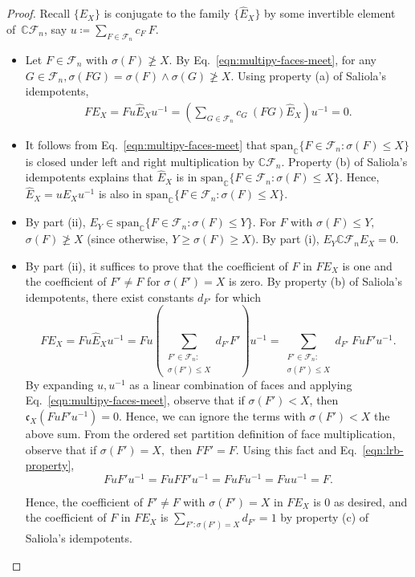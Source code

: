 \documentclass[ALCO, Unicode]{cedram}
\def\C{{\mathbb{C}}}
\begin{document}
\begin{proof}
 Recall $\{E_X\}$ is conjugate to the family $\{\widehat{E}_X\}$ by some invertible element of~$\C\mathcal{F}_n$, say $u \coloneqq  \sum_{F \in \mathcal{F}_n}c_{F} \ F.$

\begin{itemize}
    \item[(i)] Let $F \in \mathcal{F}_n$ with $\sigma(F) \ngeq X.$ By Eq.~\eqref{eqn:multipy-faces-meet}, for any $G \in \mathcal{F}_n,  \sigma(FG) = \sigma(F) \wedge \sigma(G) \ngeq X.$ Using property (a) of Saliola's idempotents,
    \begin{align*}
        FE_X = Fu\widehat{E}_Xu^{-1} = \left(\sum_{G \in \mathcal{F}_n}c_G \ (FG)\widehat{E}_X\right)u^{-1} = 0.
    \end{align*}
\item[(ii)] It follows from Eq.~\eqref{eqn:multipy-faces-meet} that $\mathrm{span}_\C \{F \in \mathcal{F}_n: \sigma(F) \leq X\}$ is closed under left and right multiplication by $\C \mathcal{F}_n.$ Property (b) of Saliola's idempotents explains that $\widehat{E}_X$ is in $\mathrm{span}_\C \{F \in \mathcal{F}_n: \sigma(F) \leq X\}.$ Hence, $\widehat{E}_X = uE_Xu^{-1}$ is also in $\mathrm{span}_\C \{F \in \mathcal{F}_n: \sigma(F) \leq X\}.$
\item[(iii)]  By part (ii), $E_Y \in \mathrm{span}_\C \{F\in \mathcal{F}_n: \sigma(F) \leq Y\}.$ For $F$ with $\sigma(F) \leq Y,$ $\sigma(F) \ngeq X$ (since otherwise, $Y \geq \sigma(F) \geq X).$ By part (i), $E_Y \C \mathcal{F}_n E_{X} = 0.$
\item[(iv)] By part (ii), it suffices to prove that the coefficient of $F$ in $FE_X$ is one and the coefficient of $F' \neq F$ for $\sigma(F') = X$ is zero. By property (b) of Saliola's idempotents, there exist constants $d_{F'}$ for which \[FE_X = Fu\widehat{E}_Xu^{-1} = Fu \left(\sum_{\substack{F' \in \mathcal{F}_n:\\ \sigma(F') \leq X}}d_{F'}F'\right)u^{-1} = \sum_{\substack{F' \in \mathcal{F}_n:\\ \sigma(F') \leq X}}d_{F'} \ FuF'u^{-1}.\] 
By expanding $u, u^{-1}$ as a linear combination of faces and applying Eq.~\eqref{eqn:multipy-faces-meet}, observe that if $\sigma(F') < X$, then  $\mathfrak{c}_X \left(FuF'u^{-1}\right) = 0.$ Hence, we can ignore the terms with $\sigma(F') < X$ the above sum. From the ordered set partition definition of face multiplication, observe that if $\sigma(F') = X,$ then $F F' = F.$ Using this fact and  Eq.~\eqref{eqn:lrb-property}, \[FuF'u^{-1} = FuFF'u^{-1} = FuFu^{-1} = Fuu^{-1} = F.\]

Hence, the coefficient of $F' \neq F$ with $\sigma(F') = X$ in $FE_X$ is $0$ as desired, and the coefficient of $F$ in $FE_X$ is $\sum_{F': \sigma(F') = X}d_{F'} = 1$ by property (c) of Saliola's idempotents. 
\end{itemize}
\end{proof}
\end{document}
